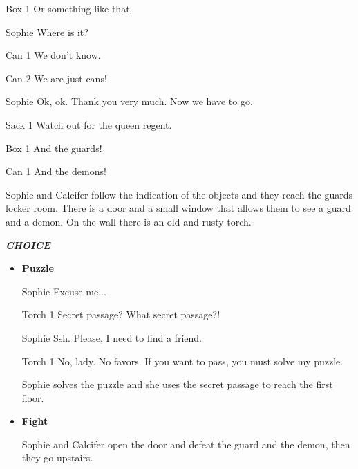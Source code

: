 \begin{screenplay}
\begin{dialogue}{Box 1}
Or something like that.
\end{dialogue}
\begin{dialogue}{Sophie}
Where is it?
\end{dialogue}
\begin{dialogue}{Can 1}
We don’t know.
\end{dialogue}
\begin{dialogue}{Can 2}
We are just cans!
\end{dialogue}
\begin{dialogue}{Sophie}
Ok, ok. Thank you very much. Now we have to go.
\end{dialogue}
\begin{dialogue}{Sack 1}
Watch out for the queen regent.
\end{dialogue}
\begin{dialogue}{Box 1}
And the guards!
\end{dialogue}
\begin{dialogue}{Can 1}
And the demons!
\end{dialogue}
\end{screenplay}
\vspace{1em}


Sophie and Calcifer follow the indication of the objects and they reach the guards locker room. There is a door and a small window that allows them to see a guard and a demon. On the wall there is an old and rusty torch.

\textit{\textbf{CHOICE}}
\begin{itemize}
  \item \textbf{Puzzle}
  
\begin{screenplay}

\begin{dialogue}{Sophie}
Excuse me...
\end{dialogue}

\begin{dialogue}{Torch 1}
Secret passage? What secret passage?!
\end{dialogue}

\begin{dialogue}{Sophie}
Ssh. Please, I need to find a friend.
\end{dialogue}

\begin{dialogue}[determined]{Torch 1}
No, lady. No favors. If you want to pass, you must solve my puzzle.
\end{dialogue}

\end{screenplay}
\vspace{1em}

    Sophie solves the puzzle and she uses the secret passage to reach the first floor.

  \item \textbf{Fight}
  
  Sophie and Calcifer open the door and defeat the guard and the demon, then they go upstairs.
\end{itemize}

